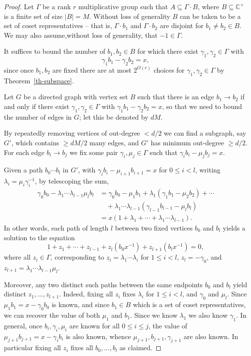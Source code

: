 \documentclass{amsart}
\renewcommand{\leq}{\leqslant}
\renewcommand{\geq}{\geqslant}
\newcommand{\bbc}{\mathbb{C}}
\newcommand{\abs}[1]{\left\lvert #1\right\rvert}
\theoremstyle{definition}
\begin{document}
\begin{proof}
Let $\Gamma$ be a rank $r$ multiplicative group such that $A\subseteq \Gamma\cdot B$, where $B\subseteq \bbc^\times$ is a finite set of size $\abs{B}=M$. Without loss of generality $B$ can be taken to be a set of coset representatives -- that is, $\Gamma\cdot b_1$ and $\Gamma\cdot b_2$ are disjoint for $b_1\neq b_2\in B$. We may also assume,without loss of generality, that $-1\in \Gamma$.

It suffices to bound the number of $b_1,b_2\in B$ for which there exist $\gamma_1,\gamma_2\in \Gamma$ with
\[\gamma_1b_1-\gamma_2b_2=x,\]
since once $b_1,b_2$ are fixed there are at most $2^{O(r)}$ choices for $\gamma_1,\gamma_2\in \Gamma$ by Theorem~\ref{th-subspace}.

Let $G$ be a directed graph with vertex set $B$ such that there is an edge $b_1\to b_2$ if and only if there exist $\gamma_1,\gamma_2\in \Gamma$ with $\gamma_1b_1-\gamma_2b_2=x$, so that we need to bound the number of edges in $G$; let this be denoted by $dM$.

By repeatedly removing vertices of out-degree $<d/2$ we can find a subgraph, say $G'$, which contains $\geq dM/2$ many edges, and $G'$ has minimum out-degree $\geq d/2$. For each edge $b_i\to b_j$ we fix some pair $\gamma_i,\mu_j\in \Gamma$ such that $\gamma_ib_i-\mu_jb_j=x$.

Given a path $b_0\cdots b_l$ in $G'$, with $\gamma_ib_i-\mu_{i+1}b_{i+1}=x$ for $0\leq i<l$, writing $\lambda_i=\mu_i\gamma_i^{-1}$, by telescoping the sum,
\begin{align*}
\gamma_0b_0-\lambda_1\cdots \lambda_{l-1}\mu_lb_l
&= \gamma_0b_0-\mu_1b_1+\lambda_1(\gamma_1b_1-\mu_2b_2)+\cdots\\
&\quad+\lambda_1\cdots\lambda_{l-1}(\gamma_{l-1}b_{l-1}-\mu_lb_l)\\
&=x(1+\lambda_1+\cdots+\lambda_1\cdots \lambda_{l-1}).
\end{align*}
In other words, each path of length $l$ between two fixed vertices $b_0$ and $b_l$ yields a solution to the equation
\begin{equation}\label{eq-path}
1+z_1+\cdots+z_{l-1}+z_l(b_0x^{-1})+z_{l+1}(b_lx^{-1})=0,
\end{equation}
where all $z_i\in \Gamma$, corresponding to $z_i=\lambda_1\cdots \lambda_i$ for $1\leq i<l$, $z_l=-\gamma_0$, and $z_{l+1}=\lambda_1\cdots \lambda_{l-1}\mu_l$.

Moreover, any two distinct such paths between the same endpoints $b_0$ and $b_l$ yield distinct $z_1,\ldots,z_{l+1}$. Indeed, fixing all $z_i$ fixes $\lambda_i$ for $1\leq i<l$, and $\gamma_0$ and $\mu_l$. Since $\mu_1b_1=x-\gamma_0b_0$ is known, and since $b_1\in B$ which is a set of coset representatives, we can recover the value of both $\mu_1$ and $b_1$. Since we know $\lambda_1$ we also know $\gamma_1$. In general, once $b_i,\gamma_i,\mu_i$ are known for all $0\leq i\leq j$, the value of $\mu_{j+1}b_{j+1}=x-\gamma_ib_i$ is also known, whence $\mu_{j+1},b_{j+1},\gamma_{j+1}$ are also known. In particular fixing all $z_i$ fixes all $b_0,\ldots,b_l$ as claimed.


\end{proof}
\end{document}
